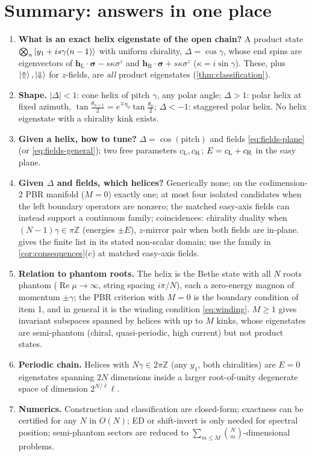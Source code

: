 \documentclass[11pt,a4paper]{article}
\theoremstyle{definition}
\newcommand{\hL}{\mathbf h_{\mathrm L}}
\newcommand{\hR}{\mathbf h_{\mathrm R}}
\newcommand{\bsig}{\boldsymbol\sigma}
\newcommand{\re}{\operatorname{Re}}
\begin{document}
\section{Summary: answers in one place}\label{sec:summary}
\begin{enumerate}[label=\arabic*.]
\item \textbf{What is an exact helix eigenstate of the open chain?} A product state $\bigotimes_n\ket{y_1+is\gamma(n-1)}$ with uniform chirality, $\Delta=\cos\gamma$, whose end spins are eigenvectors of $\hL\cdot\bsig-s\kappa\sigma^z$ and $\hR\cdot\bsig+s\kappa\sigma^z$ ($\kappa=i\sin\gamma$). These, plus $\ket\Uparrow,\ket\Downarrow$ for $z$-fields, are \emph{all} product eigenstates (\cref{thm:classification}).
\item \textbf{Shape.} $|\Delta|<1$: cone helix of pitch $\gamma$, any polar angle; $\Delta>1$: polar helix at fixed azimuth, $\tan\frac{\theta_{n+1}}2=e^{\mp\eta_0}\tan\frac{\theta_n}2$; $\Delta<-1$: staggered polar helix. No helix eigenstate with a chirality kink exists.
\item \textbf{Given a helix, how to tune?} $\Delta=\cos(\text{pitch})$ and fields \eqref{eq:fields-plane} (or \eqref{eq:fields-general}); two free parameters $c_{\rm L},c_{\rm R}$; $E=c_{\rm L}+c_{\rm R}$ in the easy plane.
\item \textbf{Given $\Delta$ and fields, which helices?} Generically none; on the codimension-2 PBR manifold ($M=0$) exactly one; at most four isolated candidates when the left boundary operators are nonzero; the matched easy-axis fields can instead support a continuous family; coincidences: chirality duality when $(N-1)\gamma\in\pi\mathbb Z$ (energies $\pm E$), $z$-mirror pair when both fields are in-plane.  gives the finite list in its stated non-scalar domain; use the family in \cref{cor:consequences}(c) at matched easy-axis fields.
\item \textbf{Relation to phantom roots.} The helix is the Bethe state with all $N$ roots phantom ($\re\mu\to\infty$, string spacing $i\pi/N$), each a zero-energy magnon of momentum $\pm\gamma$; the PBR criterion with $M=0$ is the boundary condition of item 1, and in general it is the winding condition \eqref{eq:winding}. $M\ge1$ gives invariant subspaces spanned by helices with up to $M$ kinks, whose eigenstates are semi-phantom (chiral, quasi-periodic, high current) but not product states.
\item \textbf{Periodic chain.} Helices with $N\gamma\in2\pi\mathbb Z$ (any $y_1$, both chiralities) are $E=0$ eigenstates spanning $2N$ dimensions inside a larger root-of-unity degenerate space of dimension $2^{N/\ell}\ell$.
\item \textbf{Numerics.} Construction and classification are closed-form; exactness can be certified for any $N$ in $O(N)$; ED or shift-invert is only needed for spectral position; semi-phantom sectors are reduced to $\sum_{m\le M}\binom Nm$-dimensional problems.
\end{enumerate}
\end{document}
